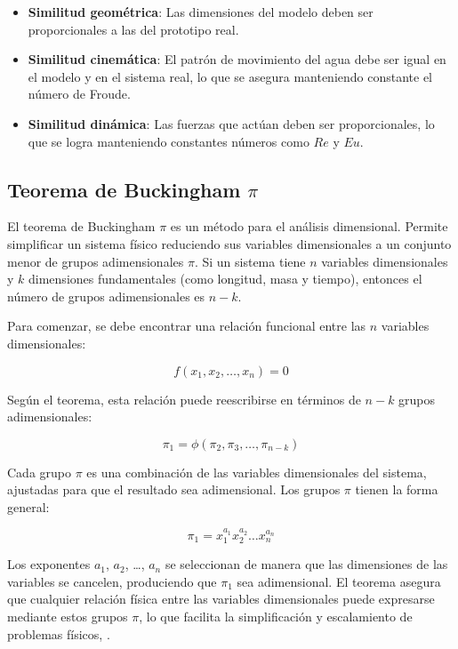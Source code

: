 \begin{itemize}
    \item \textbf{Similitud geométrica}: Las dimensiones del modelo deben ser proporcionales a las del prototipo real.
    \item \textbf{Similitud cinemática}: El patrón de movimiento del agua debe ser igual en el modelo y en el sistema real, lo que se asegura manteniendo constante el número de Froude.
    \item \textbf{Similitud dinámica}: Las fuerzas que actúan deben ser proporcionales, lo que se logra manteniendo constantes números como $Re$ y $Eu$.
\end{itemize}

\subsection{Teorema de Buckingham $\pi$}

El teorema de Buckingham $\pi$ es un método para el análisis dimensional. Permite simplificar un sistema físico reduciendo sus variables dimensionales a un conjunto menor de grupos adimensionales $\pi$. Si un sistema tiene $n$ variables dimensionales y $k$ dimensiones fundamentales (como longitud, masa y tiempo), entonces el número de grupos adimensionales es $n - k$.

Para comenzar, se debe encontrar una relación funcional entre las $n$ variables dimensionales:

\begin{equation}
f(x_1, x_2, \ldots, x_n) = 0
\end{equation}

Según el teorema, esta relación puede reescribirse en términos de $n - k$ grupos adimensionales:

\begin{equation}
\pi_1 = \phi(\pi_2, \pi_3, \ldots, \pi_{n-k})
\end{equation}

Cada grupo $\pi$ es una combinación de las variables dimensionales del sistema, ajustadas para que el resultado sea adimensional. Los grupos $\pi$ tienen la forma general:

\begin{equation}
\pi_1 = x_1^{a_1} x_2^{a_2} \ldots x_n^{a_n}
\end{equation}

Los exponentes $a_1$, $a_2$, \ldots, $a_n$ se seleccionan de manera que las dimensiones de las variables se cancelen, produciendo que $\pi_1$ sea adimensional. El teorema asegura que cualquier relación física entre las variables dimensionales puede expresarse mediante estos grupos $\pi$, lo que facilita la simplificación y escalamiento de problemas físicos, \citep{munson2011}.

